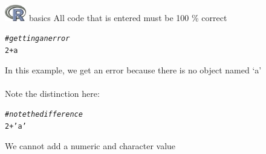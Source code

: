 \documentclass[xcolor=svgnames]{beamer}\usepackage[]{graphicx}\usepackage[]{color}
\makeatletter
\newcommand{\hlnum}[1]{\textcolor[rgb]{0.686,0.059,0.569}{#1}}%
\newcommand{\hlstr}[1]{\textcolor[rgb]{0.192,0.494,0.8}{#1}}%
\newcommand{\hlcom}[1]{\textcolor[rgb]{0.678,0.584,0.686}{\textit{#1}}}%
\newcommand{\hlopt}[1]{\textcolor[rgb]{0,0,0}{#1}}%
\newcommand{\hlstd}[1]{\textcolor[rgb]{0.345,0.345,0.345}{#1}}%
\newenvironment{kframe}{%
 \def\at@end@of@kframe{}%
 \ifinner\ifhmode%
  \def\at@end@of@kframe{\end{minipage}}%
  \begin{minipage}{\columnwidth}%
 \fi\fi%
 \def\FrameCommand##1{\hskip\@totalleftmargin \hskip-\fboxsep
 \colorbox{shadecolor}{##1}\hskip-\fboxsep
     \hskip-\linewidth \hskip-\@totalleftmargin \hskip\columnwidth}%
 \MakeFramed {\advance\hsize-\width
   \@totalleftmargin\z@ \linewidth\hsize
   \@setminipage}}%
 {\par\unskip\endMakeFramed%
 \at@end@of@kframe}
\newenvironment{knitrout}{}{} %
\makeatother
\begin{document}
\begin{frame}[fragile]{\includegraphics[width=0.07\textwidth]{Rlogo.jpg} \hspace{0.01in} basics}
All code that is entered must be 100 \% correct
\begin{knitrout}\scriptsize
{}\color{fgcolor}\begin{kframe}
\begin{alltt}
\hlcom{# getting an error}
\hlnum{2} \hlopt{+} \hlstd{a}
\end{alltt}


{\ttfamily\noindent\bfseries\color{errorcolor}{\#\# Error: object 'a' not found}}\end{kframe}
\end{knitrout}
In this example, we get an error because there is no object named `a'\\~\\
Note the distinction here:
\begin{knitrout}\scriptsize
{}\color{fgcolor}\begin{kframe}
\begin{alltt}
\hlcom{# note the difference}
\hlnum{2} \hlopt{+} \hlstr{'a'}
\end{alltt}


{\ttfamily\noindent\bfseries\color{errorcolor}{\#\# Error: non-numeric argument to binary operator}}\end{kframe}
\end{knitrout}
We cannot add a numeric and character value
\end{frame}
\end{document}
